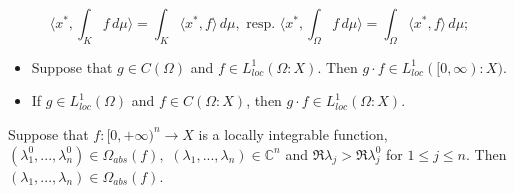 \documentclass[10pt,a4paper]{amsart}
\begin{document}
\begin{equation}\label{sex-pistols}
\bigg\langle x^*,\int_Kf\,d\mu\bigg\rangle=\int_K \bigl \langle x^*,f\bigr \rangle \, d\mu,\text{ resp. }\bigg\langle x^*,\int_{\Omega}f\,d\mu\bigg\rangle=\int_{\Omega}\bigl \langle x^*,f\bigr \rangle \, d\mu;
\end{equation}

\begin{lem}\label{bnm1}
\begin{itemize}
\item[(i)] Suppose that $g\in C(\Omega)$ and $f\in L_{loc}^1(\Omega:X)$.
Then $g\cdot f\in L_{loc}^1([0,\infty):X)$.
\item[(ii)] If $g\in L_{loc}^1(\Omega)$ and $f\in C(\Omega:X)$, then $g\cdot f\in L_{loc}^1(\Omega:X)$.
\end{itemize}
\end{lem}

\begin{thm}\label{dl}
Suppose that $f: [0,+\infty)^{n}\rightarrow X$ is a locally integrable function, $(\lambda_{1}^{0},...,\lambda_{n}^{0})\in \Omega_{abs}(f),$  $(\lambda_{1},...,\lambda_{n})\in {\mathbb C}^{n}$ and $\Re \lambda_{j} >\Re \lambda_{j}^{0}$ for $1\leq j\leq n.$ Then $(\lambda_{1},...,\lambda_{n})\in \Omega_{abs}(f).$
\end{thm}
\end{document}
